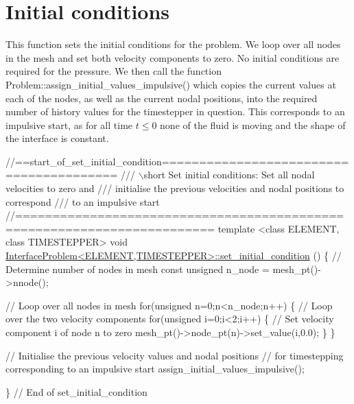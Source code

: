  

\hypertarget{index_set_initial_condition}{}\section{Initial conditions}\label{index_set_initial_condition}
This function sets the initial conditions for the problem. We loop over all nodes in the mesh and set both velocity components to zero. No initial conditions are required for the pressure. We then call the function {\ttfamily Problem\+::assign\+\_\+initial\+\_\+values\+\_\+impulsive()} which copies the current values at each of the nodes, as well as the current nodal positions, into the required number of history values for the timestepper in question. This corresponds to an impulsive start, as for all time $ t \leq 0 $ none of the fluid is moving and the shape of the interface is constant.


\begin{DoxyCodeInclude}
\textcolor{comment}{//==start\_of\_set\_initial\_condition========================================}
\textcolor{comment}{/// \(\backslash\)short Set initial conditions: Set all nodal velocities to zero and}
\textcolor{comment}{}\textcolor{comment}{/// initialise the previous velocities and nodal positions to correspond}
\textcolor{comment}{}\textcolor{comment}{/// to an impulsive start}
\textcolor{comment}{}\textcolor{comment}{//========================================================================}
\textcolor{keyword}{template} <\textcolor{keyword}{class} ELEMENT, \textcolor{keyword}{class} TIMESTEPPER>
\textcolor{keywordtype}{void} \hyperlink{classInterfaceProblem_a0d3af8378c4f0a6e38636be958c300d5}{InterfaceProblem<ELEMENT,TIMESTEPPER>::set\_initial\_condition}
      ()
\{
 \textcolor{comment}{// Determine number of nodes in mesh}
 \textcolor{keyword}{const} \textcolor{keywordtype}{unsigned} n\_node = mesh\_pt()->nnode();
 
 \textcolor{comment}{// Loop over all nodes in mesh}
 \textcolor{keywordflow}{for}(\textcolor{keywordtype}{unsigned} n=0;n<n\_node;n++)
  \{
   \textcolor{comment}{// Loop over the two velocity components}
   \textcolor{keywordflow}{for}(\textcolor{keywordtype}{unsigned} i=0;i<2;i++)
    \{
     \textcolor{comment}{// Set velocity component i of node n to zero}
     mesh\_pt()->node\_pt(n)->set\_value(i,0.0);
    \}
  \}
 
 \textcolor{comment}{// Initialise the previous velocity values and nodal positions}
 \textcolor{comment}{// for timestepping corresponding to an impulsive start}
 assign\_initial\_values\_impulsive();
 
\} \textcolor{comment}{// End of set\_initial\_condition}

\end{DoxyCodeInclude}




